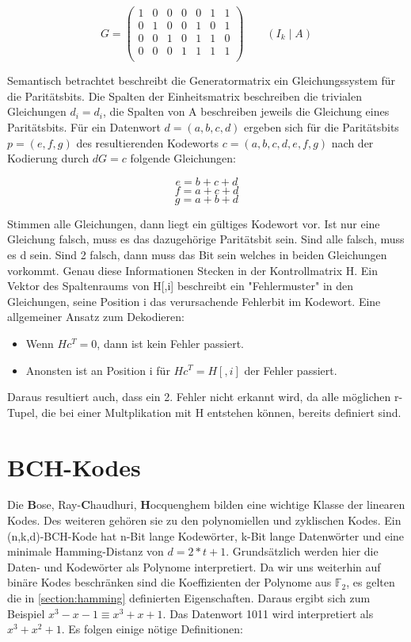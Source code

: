 $$G = \begin{pmatrix}
1 & 0 & 0 & 0 & 0 & 1 & 1 \\
0 & 1 & 0 & 0 & 1 & 0 & 1 \\
0 & 0 & 1 & 0 & 1 & 1 & 0 \\
0 & 0 & 0 & 1 & 1 & 1 & 1 \\
\end{pmatrix}\qquad{(I_k \mid A)}$$

Semantisch betrachtet beschreibt die Generatormatrix ein Gleichungssystem für die Paritätsbits. Die Spalten der Einheitsmatrix beschreiben die trivialen Gleichungen $d_i = d_i$, die Spalten von A beschreiben jeweils die Gleichung eines Paritätsbits. Für ein Datenwort $d=(a,b,c,d)$ ergeben sich für die Paritätsbits $p=(e,f,g)$ des resultierenden Kodeworts $c=(a,b,c,d,e,f,g)$ nach der Kodierung durch $dG = c$ folgende Gleichungen:

$$ e = b+c+d$$
$$ f = a+c+d$$
$$ g = a+b+d$$

Stimmen alle Gleichungen, dann liegt ein gültiges Kodewort vor. Ist nur eine Gleichung falsch, muss es das dazugehörige Paritätsbit sein. Sind alle falsch, muss es d sein. Sind 2 falsch, dann muss das Bit sein welches in beiden Gleichungen vorkommt. Genau diese Informationen Stecken in der Kontrollmatrix H. Ein Vektor des Spaltenraums von H[,i] beschreibt ein "Fehlermuster" in den Gleichungen, seine Position i das verursachende Fehlerbit im Kodewort. Eine allgemeiner Ansatz zum Dekodieren:

\begin{itemize}
\item Wenn $Hc^T = 0$, dann ist kein Fehler passiert.
\item Anonsten ist an Position i für $Hc^T = H[ ,i]$ der Fehler passiert.
\end{itemize}

Daraus resultiert auch, dass ein 2. Fehler nicht erkannt wird, da alle möglichen r-Tupel, die bei einer Multplikation mit H entstehen können, bereits definiert sind. 


\section{BCH-Kodes}

Die \textbf{B}ose, Ray-\textbf{C}haudhuri, \textbf{H}ocquenghem bilden eine wichtige Klasse der linearen Kodes. Des weiteren gehören sie zu den polynomiellen und zyklischen Kodes.\cite[Kap. 5.1]{huffman2010fundamentals}
Ein (n,k,d)-BCH-Kode hat n-Bit lange Kodewörter, k-Bit lange Datenwörter und eine minimale Hamming-Distanz von $d = 2*t+1$.
Grundsätzlich werden hier die Daten- und Kodewörter als Polynome interpretiert. Da wir uns weiterhin auf binäre Kodes beschränken sind die Koeffizienten der Polynome aus 
$\mathbb{F}_{2}$, es gelten die in \ref{section:hamming} definierten Eigenschaften. Daraus ergibt sich zum Beispiel $x^3 -x -1 \equiv x^3 + x + 1$. Das Datenwort 1011 wird interpretiert als $x^3 + x^2 + 1$. Es folgen einige nötige Definitionen:

